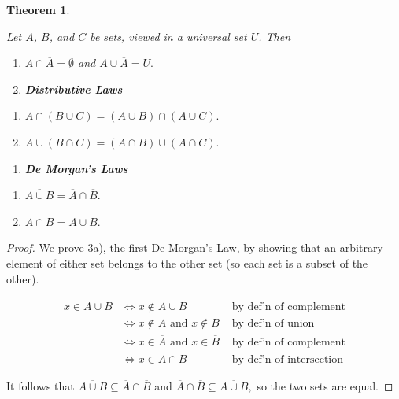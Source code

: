 \documentclass[
]{book}
\providecommand{\tightlist}{%
  \setlength{\itemsep}{0pt}\setlength{\parskip}{0pt}}
\newtheorem{theorem}{Theorem}[chapter]
\theoremstyle{definition}
\theoremstyle{definition}
\theoremstyle{definition}
\theoremstyle{definition}
\theoremstyle{remark}
\begin{document}
\begin{theorem}
\protect\hypertarget{thm:basic-set-props}{}\label{thm:basic-set-props}

Let \(A\), \(B\), and \(C\) be sets, viewed in a universal set \(U\). Then

\begin{enumerate}
\def\labelenumi{\arabic{enumi}.}
\item
  \(A \cap \overline{A} = \emptyset\) and \(A \cup \overline{A} = U.\)
\item
  \textbf{Distributive Laws}
\end{enumerate}

\begin{enumerate}
\def\labelenumi{\alph{enumi})}
\tightlist
\item
  \(A \cap (B \cup C) = (A \cup B) \cap (A \cup C).\)
\item
  \(A \cup (B \cap C) = (A \cap B) \cup (A \cap C).\)
\end{enumerate}

\begin{enumerate}
\def\labelenumi{\arabic{enumi}.}
\setcounter{enumi}{2}
\tightlist
\item
  \textbf{De Morgan's Laws}
\end{enumerate}

\begin{enumerate}
\def\labelenumi{\alph{enumi})}
\tightlist
\item
  \(\overline{A \cup B} = \overline{A} \cap \overline{B}.\)
\item
  \(\overline{A \cap B} = \overline{A} \cup \overline{B}.\)
\end{enumerate}

\end{theorem}

\begin{proof}
We prove 3a), the first De Morgan's Law, by showing that an arbitrary element of either set belongs to the other set (so each set is a subset of the other).

\begin{align*}
x \in \overline{A \cup B} &\iff x \notin A \cup B & \text{ by def'n of complement}\\
    &\iff x \notin A \text{ and } x \notin B & \text{ by def'n of union}\\
    &\iff x \in \overline{A} \text{ and } x \in \overline{B} & \text{ by def'n of complement} \\
    &\iff x \in \overline{A} \cap \overline{B} & \text{ by def'n of intersection}
\end{align*}

It follows that \(\overline{A \cup B} \subseteq \overline{A} \cap \overline{B}\) and \(\overline{A} \cap \overline{B} \subseteq \overline{A \cup B},\) so the two sets are equal.
\end{proof}
\end{document}
